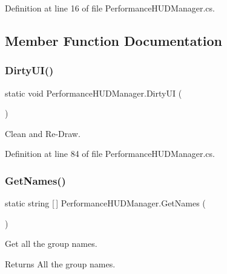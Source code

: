 Definition at line 16 of file Performance\+H\+U\+D\+Manager.\+cs.



\subsection{Member Function Documentation}
\mbox{\label{class_performance_h_u_d_manager_a54f1660556013d694c89ce9c84453614}} 
\subsubsection{\texorpdfstring{Dirty\+U\+I()}{DirtyUI()}}
{\footnotesize\ttfamily static void Performance\+H\+U\+D\+Manager.\+Dirty\+UI (\begin{DoxyParamCaption}{ }\end{DoxyParamCaption})\hspace{0.3cm}{\ttfamily [static]}}



Clean and Re-\/\+Draw. 



Definition at line 84 of file Performance\+H\+U\+D\+Manager.\+cs.

\mbox{\label{class_performance_h_u_d_manager_ae70ce14a75f1578cea6e15901fc2b305}} 
\subsubsection{\texorpdfstring{Get\+Names()}{GetNames()}}
{\footnotesize\ttfamily static string \mbox{[}$\,$\mbox{]} Performance\+H\+U\+D\+Manager.\+Get\+Names (\begin{DoxyParamCaption}{ }\end{DoxyParamCaption})\hspace{0.3cm}{\ttfamily [static]}}



Get all the group names. 

\begin{DoxyReturn}{Returns}
All the group names. 
\end{DoxyReturn}


